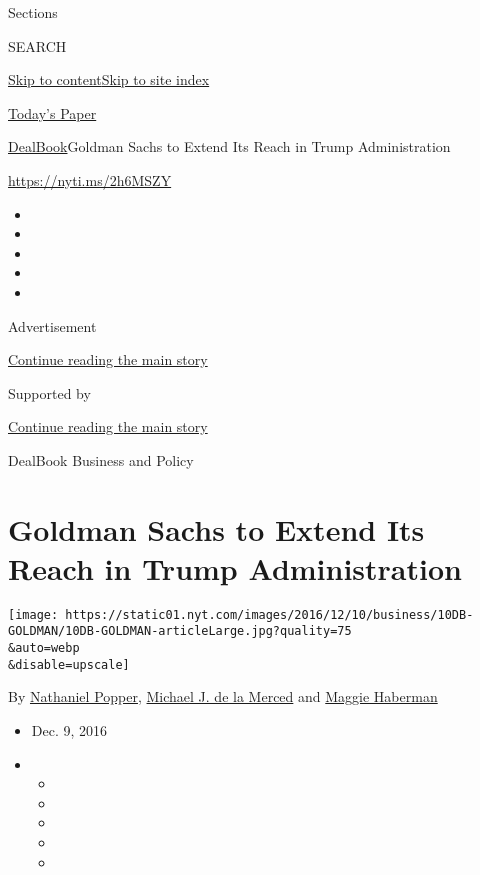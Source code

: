 Sections

SEARCH

\protect\hyperlink{site-content}{Skip to
content}\protect\hyperlink{site-index}{Skip to site index}

\href{https://myaccount.nytimes.com/auth/login?response_type=cookie\&client_id=vi}{}

\href{https://www.nytimes.com/section/todayspaper}{Today's Paper}

\href{/section/business/dealbook}{DealBook}\textbar{}Goldman Sachs to
Extend Its Reach in Trump Administration

\url{https://nyti.ms/2h6MSZY}

\begin{itemize}
\item
\item
\item
\item
\item
\end{itemize}

Advertisement

\protect\hyperlink{after-top}{Continue reading the main story}

Supported by

\protect\hyperlink{after-sponsor}{Continue reading the main story}

DealBook Business and Policy

\hypertarget{goldman-sachs-to-extend-its-reach-in-trump-administration}{%
\section{Goldman Sachs to Extend Its Reach in Trump
Administration}\label{goldman-sachs-to-extend-its-reach-in-trump-administration}}

\texttt{[image: https://static01.nyt.com/images/2016/12/10/business/10DB-GOLDMAN/10DB-GOLDMAN-articleLarge.jpg?quality=75\\\&auto=webp\\\&disable=upscale]}

By \href{http://www.nytimes.com/by/nathaniel-popper}{Nathaniel Popper},
\href{http://www.nytimes.com/by/michael-j-de-la-merced}{Michael J. de la
Merced} and \href{http://www.nytimes.com/by/maggie-haberman}{Maggie
Haberman}

\begin{itemize}
\item
  Dec. 9, 2016
\item
  \begin{itemize}
  \item
  \item
  \item
  \item
  \item
  \end{itemize}
\end{itemize}

